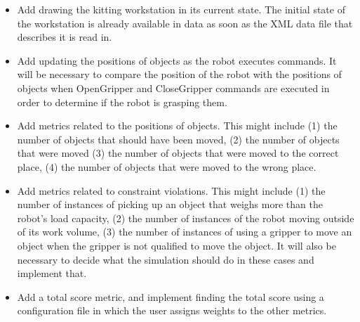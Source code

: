 \begin{itemize}

\item Add drawing the kitting workstation in its current state. The initial
  state of the workstation is already available in data as soon as the XML
  data file that describes it is read in. 

\item Add updating the positions of objects as the robot executes commands.
  It will be necessary to compare the position of the robot with the
  positions of objects when OpenGripper and CloseGripper commands are
  executed in order to determine if the robot is grasping them.

\item Add metrics related to the positions of objects. This might include
  (1) the number of objects that should have been moved, (2) the number of
  objects that were moved (3) the number of objects that were moved to the
  correct place, (4) the number of objects that were moved to the wrong
  place.

\item Add metrics related to constraint violations. This might include (1)
  the number of instances of picking up an object that weighs more than the
  robot's load capacity, (2) the number of instances of the robot moving
  outside of its work volume, (3) the number of instances of using a
  gripper to move an object when the gripper is not qualified to move the
  object. It will also be necessary to decide what the simulation should do
  in these cases and implement that.

\item Add a total score metric, and implement finding the total score using
  a configuration file in which the user assigns weights to the other
  metrics.

\end{itemize}
